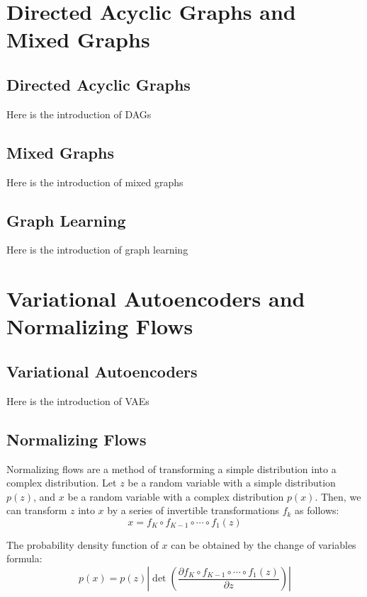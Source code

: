 \documentclass[10pt]{article}
\begin{document}
\section{Directed Acyclic Graphs and Mixed Graphs}
\subsection{Directed Acyclic Graphs}

Here is the introduction of DAGs

\subsection{Mixed Graphs}

Here is the introduction of mixed graphs

\subsection{Graph Learning}

Here is the introduction of graph learning

\section{Variational Autoencoders and Normalizing Flows}

\subsection{Variational Autoencoders}

Here is the introduction of VAEs

\subsection{Normalizing Flows}

Normalizing flows are a method of transforming a simple distribution into a complex distribution. \cite{rezende15normalizingflows} Let $z$ be a random variable with a simple distribution $p(z)$, and $x$ be a random variable with a complex distribution $p(x)$. Then, we can transform $z$ into $x$ by a series of invertible transformations $f_k$ as follows:
\begin{equation}
    x = f_K \circ f_{K-1} \circ \cdots \circ f_1(z)
\end{equation}

The probability density function of $x$ can be obtained by the change of variables formula:
\begin{equation}
    p(x) = p(z) \left| \det \left( \frac{\partial f_K \circ f_{K-1} \circ \cdots \circ f_1(z)}{\partial z} \right) \right|
\end{equation}
\end{document}
